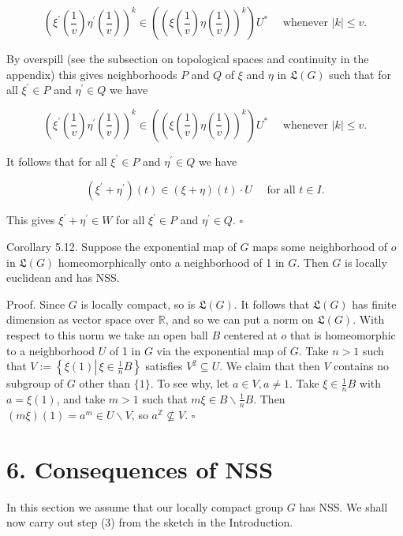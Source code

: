 \documentclass[10pt]{article}
\begin{document}
$$
\left(\xi^{\prime}\left(\frac{1}{v}\right) \eta^{\prime}\left(\frac{1}{v}\right)\right)^{k} \in\left(\left(\xi\left(\frac{1}{v}\right) \eta\left(\frac{1}{v}\right)\right)^{k}\right) U^{*} \quad \text { whenever }|k| \leq v .
$$

By overspill (see the subsection on topological spaces and continuity in the appendix) this gives neighborhoods $P$ and $Q$ of $\xi$ and $\eta$ in $\mathfrak{L}(G)$ such that for all $\xi^{\prime} \in P$ and $\eta^{\prime} \in Q$ we have

$$
\left(\xi^{\prime}\left(\frac{1}{v}\right) \eta^{\prime}\left(\frac{1}{v}\right)\right)^{k} \in\left(\left(\xi\left(\frac{1}{v}\right) \eta\left(\frac{1}{v}\right)\right)^{k}\right) U^{*} \quad \text { whenever }|k| \leq v .
$$

It follows that for all $\xi^{\prime} \in P$ and $\eta^{\prime} \in Q$ we have

$$
\left(\xi^{\prime}+\eta^{\prime}\right)(t) \in(\xi+\eta)(t) \cdot U \quad \text { for all } t \in I .
$$

This gives $\xi^{\prime}+\eta^{\prime} \in W$ for all $\xi^{\prime} \in P$ and $\eta^{\prime} \in Q$. \(\square\)

Corollary 5.12. Suppose the exponential map of $G$ maps some neighborhood of $o$ in $\mathfrak{L}(G)$ homeomorphically onto a neighborhood of 1 in $G$. Then $G$ is locally euclidean and has NSS.

Proof. Since $G$ is locally compact, so is $\mathfrak{L}(G)$. It follows that $\mathfrak{L}(G)$ has finite dimension as vector space over $\mathbb{R}$, and so we can put a norm on $\mathfrak{L}(G)$. With respect to this norm we take an open ball $B$ centered at $o$ that is homeomorphic to a neighborhood $U$ of 1 in $G$ via the exponential map of $G$. Take $n>1$ such that $V:=\left\{\xi(1) \left\lvert\, \xi \in \frac{1}{n} B\right.\right\}$ satisfies $V^{2} \subseteq U$. We claim that then $V$ contains no subgroup of $G$ other than $\{1\}$. To see why, let $a \in V, a \neq 1$. Take $\xi \in \frac{1}{n} B$ with $a=\xi(1)$, and take $m>1$ such that $m \xi \in B \backslash \frac{1}{n} B$. Then $(m \xi)(1)=a^{m} \in U \backslash V$, so $a^{\mathbb{Z}} \nsubseteq V$. \(\square\)

\section*{6. Consequences of NSS}
In this section we assume that our locally compact group $G$ has NSS. We shall now carry out step (3) from the sketch in the Introduction.
\end{document}
